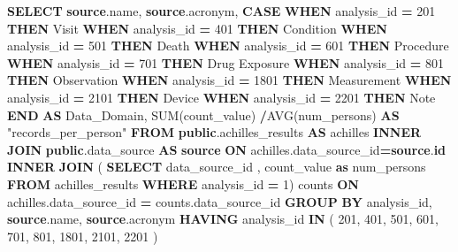 \documentclass[
]{book}
\newenvironment{Shaded}{\begin{snugshade}}{\end{snugshade}}
\newcommand{\ControlFlowTok}[1]{\textcolor[rgb]{0.13,0.29,0.53}{\textbf{#1}}}
\newcommand{\DecValTok}[1]{\textcolor[rgb]{0.00,0.00,0.81}{#1}}
\newcommand{\FunctionTok}[1]{\textcolor[rgb]{0.00,0.00,0.00}{#1}}
\newcommand{\KeywordTok}[1]{\textcolor[rgb]{0.13,0.29,0.53}{\textbf{#1}}}
\newcommand{\NormalTok}[1]{#1}
\newcommand{\OperatorTok}[1]{\textcolor[rgb]{0.81,0.36,0.00}{\textbf{#1}}}
\newcommand{\OtherTok}[1]{\textcolor[rgb]{0.56,0.35,0.01}{#1}}
\newcommand{\StringTok}[1]{\textcolor[rgb]{0.31,0.60,0.02}{#1}}
\begin{document}
\begin{Shaded}
\begin{Highlighting}[]
\KeywordTok{SELECT} 
    \KeywordTok{source}\NormalTok{.name,}
    \KeywordTok{source}\NormalTok{.acronym,}
    \ControlFlowTok{CASE} 
    \ControlFlowTok{WHEN}\NormalTok{ analysis\_id }\OperatorTok{=} \DecValTok{201}
      \ControlFlowTok{THEN} \StringTok{\textquotesingle{}Visit\textquotesingle{}}
    \ControlFlowTok{WHEN}\NormalTok{ analysis\_id }\OperatorTok{=} \DecValTok{401}
      \ControlFlowTok{THEN} \StringTok{\textquotesingle{}Condition\textquotesingle{}}
    \ControlFlowTok{WHEN}\NormalTok{ analysis\_id }\OperatorTok{=} \DecValTok{501}
      \ControlFlowTok{THEN} \StringTok{\textquotesingle{}Death\textquotesingle{}}
    \ControlFlowTok{WHEN}\NormalTok{ analysis\_id }\OperatorTok{=} \DecValTok{601}
      \ControlFlowTok{THEN} \StringTok{\textquotesingle{}Procedure\textquotesingle{}}
    \ControlFlowTok{WHEN}\NormalTok{ analysis\_id }\OperatorTok{=} \DecValTok{701}
      \ControlFlowTok{THEN} \StringTok{\textquotesingle{}Drug Exposure\textquotesingle{}}
    \ControlFlowTok{WHEN}\NormalTok{ analysis\_id }\OperatorTok{=} \DecValTok{801}
      \ControlFlowTok{THEN} \StringTok{\textquotesingle{}Observation\textquotesingle{}}
    \ControlFlowTok{WHEN}\NormalTok{ analysis\_id }\OperatorTok{=} \DecValTok{1801}
      \ControlFlowTok{THEN} \StringTok{\textquotesingle{}Measurement\textquotesingle{}}
    \ControlFlowTok{WHEN}\NormalTok{ analysis\_id }\OperatorTok{=} \DecValTok{2101}
      \ControlFlowTok{THEN} \StringTok{\textquotesingle{}Device\textquotesingle{}}
    \ControlFlowTok{WHEN}\NormalTok{ analysis\_id }\OperatorTok{=} \DecValTok{2201}
      \ControlFlowTok{THEN} \StringTok{\textquotesingle{}Note\textquotesingle{}}
    \ControlFlowTok{END} \KeywordTok{AS}\NormalTok{ Data\_Domain,}
    \FunctionTok{SUM}\NormalTok{(count\_value) }\OperatorTok{/}\FunctionTok{AVG}\NormalTok{(num\_persons)}
      \KeywordTok{AS} \OtherTok{"records\_per\_person"}
\KeywordTok{FROM} \KeywordTok{public}\NormalTok{.achilles\_results }\KeywordTok{AS}\NormalTok{ achilles}
\KeywordTok{INNER} \KeywordTok{JOIN} \KeywordTok{public}\NormalTok{.data\_source }\KeywordTok{AS} \KeywordTok{source}
  \KeywordTok{ON}\NormalTok{ achilles.data\_source\_id}\OperatorTok{=}\KeywordTok{source}\NormalTok{.}\KeywordTok{id}
\KeywordTok{INNER} \KeywordTok{JOIN}\NormalTok{ (}
  \KeywordTok{SELECT}\NormalTok{ data\_source\_id , count\_value }\KeywordTok{as}\NormalTok{ num\_persons}
  \KeywordTok{FROM}\NormalTok{ achilles\_results}
  \KeywordTok{WHERE}\NormalTok{ analysis\_id }\OperatorTok{=} \DecValTok{1}\NormalTok{) counts}
    \KeywordTok{ON}\NormalTok{ achilles.data\_source\_id }\OperatorTok{=}\NormalTok{ counts.data\_source\_id}
\KeywordTok{GROUP} \KeywordTok{BY}\NormalTok{ analysis\_id, }\KeywordTok{source}\NormalTok{.name, }\KeywordTok{source}\NormalTok{.acronym}
\KeywordTok{HAVING}
\NormalTok{  analysis\_id }\KeywordTok{IN}\NormalTok{ (}
    \DecValTok{201}\NormalTok{, }\DecValTok{401}\NormalTok{, }\DecValTok{501}\NormalTok{, }\DecValTok{601}\NormalTok{, }\DecValTok{701}\NormalTok{, }\DecValTok{801}\NormalTok{, }\DecValTok{1801}\NormalTok{, }\DecValTok{2101}\NormalTok{,}
    \DecValTok{2201}
\NormalTok{  )}
\end{Highlighting}
\end{Shaded}
\end{document}
